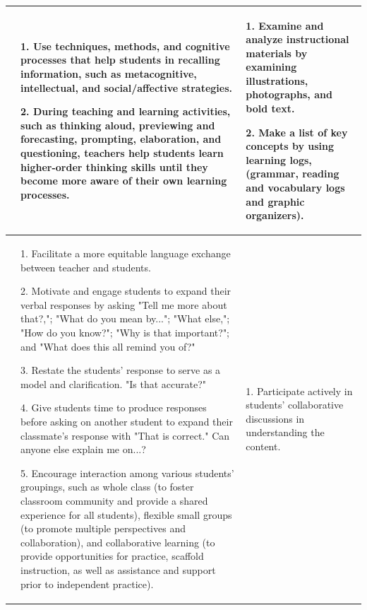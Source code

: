 \documentclass[english]{textolivre}
\begin{document}
\begin{small}
\begin{longtable}{
    >{\raggedright\arraybackslash}p{}
    p{}
    p{}
    }
\parbox[t]{2.5mm}{}

&     

1. Use techniques, methods, and cognitive processes that help students in recalling information, such as metacognitive, intellectual, and social/affective strategies.

2. During teaching and learning activities, such as thinking aloud, previewing and forecasting, prompting, elaboration, and questioning, teachers help students learn higher-order thinking skills until they become more aware of their own learning processes. 
&     
1. Examine and analyze instructional materials by examining illustrations, photographs, and bold text.

2.  Make a list of key concepts by using learning logs, (grammar, reading and vocabulary logs and graphic organizers). \\

\midrule

\parbox[t]{2.5mm}{}

 &
 
1. Facilitate a more equitable language exchange between teacher and students.

2. Motivate and engage students to expand their verbal responses by asking "Tell me more about that?,"; "What do you mean by..."; "What else,"; "How do you know?"; "Why is that important?"; and "What does this all remind you of?"

3.  Restate the students' response to serve as a model and clarification. "Is that accurate?"
    
4. Give students time to produce responses before asking on another student to expand their classmate's response with "That is correct." Can anyone else explain me on...?
    
5. Encourage interaction among various students’ groupings, such as whole class (to foster classroom community and provide a shared experience for all students), flexible small groups (to promote multiple perspectives and collaboration), and collaborative learning (to provide opportunities for practice, scaffold instruction, as well as assistance and support prior to independent practice). 

&     

1. Participate actively in students' collaborative discussions in understanding the content.


\end{longtable}
\end{small}
\end{document}
